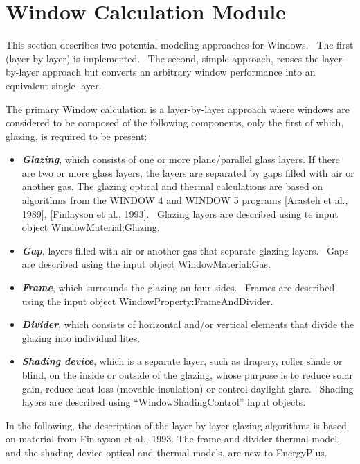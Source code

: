 \section{Window Calculation Module}\label{window-calculation-module}

This section describes two potential modeling approaches for Windows.~ The first (layer by layer) is implemented.~ The second, simple approach, reuses the layer-by-layer approach but converts an arbitrary window performance into an equivalent single layer.

The primary Window calculation is a layer-by-layer approach where windows are considered to be composed of the following components, only the first of which, glazing, is required to be present:

\begin{itemize}
\item
  \textbf{\emph{Glazing}}, which consists of one or more plane/parallel glass layers. If there are two or more glass layers, the layers are separated by gaps filled with air or another gas. The glazing optical and thermal calculations are based on algorithms from the WINDOW 4 and WINDOW 5 programs {[}Arasteh et al., 1989{]}, {[}Finlayson et al., 1993{]}.~ Glazing layers are described using te input object WindowMaterial:Glazing.
\item
  \textbf{\emph{Gap}}, layers filled with air or another gas that separate glazing layers.~ Gaps are described using the input object WindowMaterial:Gas.
\item
  \textbf{\emph{Frame}}, which surrounds the glazing on four sides.~ Frames are described using the input object WindowProperty:FrameAndDivider.
\item
  \textbf{\emph{Divider}}, which consists of horizontal and/or vertical elements that divide the glazing into individual lites.
\item
  \textbf{\emph{Shading device}}, which is a separate layer, such as drapery, roller shade or blind, on the inside or outside of the glazing, whose purpose is to reduce solar gain, reduce heat loss (movable insulation) or control daylight glare.~ Shading layers are described using ``WindowShadingControl'' input objects.
\end{itemize}

In the following, the description of the layer-by-layer glazing algorithms is based on material from Finlayson et al., 1993. The frame and divider thermal model, and the shading device optical and thermal models, are new to EnergyPlus.


